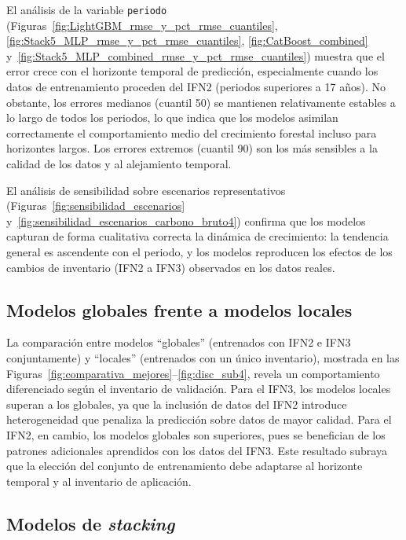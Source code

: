El análisis de la variable \texttt{periodo} (Figuras~\ref{fig:LightGBM_rmse_y_pct_rmse_cuantiles}, \ref{fig:Stack5_MLP_rmse_y_pct_rmse_cuantiles}, \ref{fig:CatBoost_combined} y~\ref{fig:Stack5_MLP_combined_rmse_y_pct_rmse_cuantiles}) muestra que el error crece con el horizonte temporal de predicción, especialmente cuando los datos de entrenamiento proceden del IFN2 (periodos superiores a 17 años). No obstante, los errores medianos (cuantil 50) se mantienen relativamente estables a lo largo de todos los periodos, lo que indica que los modelos asimilan correctamente el comportamiento medio del crecimiento forestal incluso para horizontes largos. Los errores extremos (cuantil 90) son los más sensibles a la calidad de los datos y al alejamiento temporal.

El análisis de sensibilidad sobre escenarios representativos (Figuras~\ref{fig:sensibilidad_escenarios} y~\ref{fig:sensibilidad_escenarios_carbono_bruto4}) confirma que los modelos capturan de forma cualitativa correcta la dinámica de crecimiento: la tendencia general es ascendente con el periodo, y los modelos reproducen los efectos de los cambios de inventario (IFN2 a IFN3) observados en los datos reales.

\subsection*{Modelos globales frente a modelos locales}

La comparación entre modelos ``globales'' (entrenados con IFN2 e IFN3 conjuntamente) y ``locales'' (entrenados con un único inventario), mostrada en las Figuras~\ref{fig:comparativa_mejores}--\ref{fig:disc_sub4}, revela un comportamiento diferenciado según el inventario de validación. Para el IFN3, los modelos locales superan a los globales, ya que la inclusión de datos del IFN2 introduce heterogeneidad que penaliza la predicción sobre datos de mayor calidad. Para el IFN2, en cambio, los modelos globales son superiores, pues se benefician de los patrones adicionales aprendidos con los datos del IFN3. Este resultado subraya que la elección del conjunto de entrenamiento debe adaptarse al horizonte temporal y al inventario de aplicación.

\subsection*{Modelos de \textit{stacking}}

